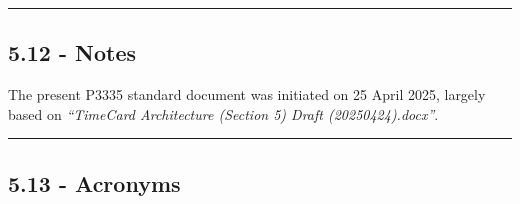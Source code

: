 \begin{center}\rule{0.5\linewidth}{0.5pt}\end{center}

\subsection{5.12 - Notes}\label{notes}

The present P3335 standard document was initiated on 25 April 2025,
largely based on \emph{``TimeCard Architecture (Section 5) Draft
(20250424).docx''}.

\begin{center}\rule{0.5\linewidth}{0.5pt}\end{center}

\subsection{5.13 - Acronyms}\label{acronyms}

